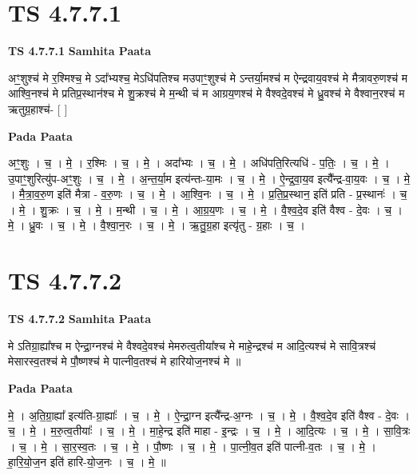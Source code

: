 \documentclass[17pt]{extarticle}
\begin{document}

\section{ TS 4.7.7.1 }

\textbf{TS 4.7.7.1 } \newline
\textbf{Samhita Paata} \newline

अꣳ॒॒शुश्च॑ मे र॒श्मिश्च॒ मे ऽदा᳚भ्यश्च॒ मेऽधि॑पतिश्च मउपाꣳ॒॒शुश्च॑ मे ऽन्तर्या॒मश्च॑ म ऐन्द्रवाय॒वश्च॑ मे मैत्रावरु॒णश्च॑ म आश्वि॒नश्च॑ मे प्रतिप्र॒स्थान॑श्च मे शु॒क्रश्च॑ मे म॒न्थी च॑ म आग्रय॒णश्च॑ मे वैश्वदे॒वश्च॑ मे ध्रु॒वश्च॑ मे वैश्वान॒रश्च॑ म ऋतुग्र॒हाश्च॑- [  ] \newline

\textbf{Pada Paata} \newline

अꣳ॒॒शुः । च॒ । मे॒ । र॒श्मिः । च॒ । मे॒ । अदा᳚भ्यः । च॒ । मे॒ । अधि॑पति॒रित्यधि॑ - प॒तिः॒ । च॒ । मे॒ । उ॒पाꣳ॒॒शुरित्यु॑प-अꣳ॒॒शुः । च॒ । मे॒ । अ॒न्त॒र्या॒म इत्य॑न्तः-या॒मः । च॒ । मे॒ । ऐ॒न्द्र॒वा॒य॒व इत्यै᳚न्द्र-वा॒य॒वः । च॒ । मे॒ । मै॒त्रा॒व॒रु॒ण इति॑ मैत्रा - व॒रु॒णः । च॒ । मे॒ । आ॒श्वि॒नः । च॒ । मे॒ । प्र॒ति॒प्र॒स्थान॒ इति॑ प्रति - प्र॒स्थानः॑ । च॒ । मे॒ । शु॒क्रः । च॒ । मे॒ । म॒न्थी । च॒ । मे॒ । आ॒ग्र॒य॒णः । च॒ । मे॒ । वै॒श्व॒दे॒व इति॑ वैश्व - दे॒वः । च॒ । मे॒ । ध्रु॒वः । च॒ । मे॒ । वै॒श्वा॒न॒रः । च॒ । मे॒ । ऋ॒तु॒ग्र॒हा इत्यृ॑तु - ग्र॒हाः । च॒ ।  \newline





\section{ TS 4.7.7.2 }

\textbf{TS 4.7.7.2 } \newline
\textbf{Samhita Paata} \newline

मे ऽतिग्रा॒ह्या᳚श्च म ऐन्द्रा॒ग्नश्च॑ मे वैश्वदे॒वश्च॑ मेमरुत्व॒तीया᳚श्च मे माहे॒न्द्रश्च॑ म आदि॒त्यश्च॑ मे सावि॒त्रश्च॑ मेसारस्व॒तश्च॑ मे पौ॒ष्णश्च॑ मे पात्नीव॒तश्च॑ मे हारियोज॒नश्च॑ मे ॥ \newline

\textbf{Pada Paata} \newline

मे॒ । अ॒ति॒ग्रा॒ह्या᳚ इत्य॑ति-ग्रा॒ह्याः᳚ । च॒ । मे॒ । ऐ॒न्द्रा॒ग्न इत्यै᳚न्द्र-अ॒ग्नः । च॒ । मे॒ । वै॒श्व॒दे॒व इति॑ वैश्व - दे॒वः । च॒ । मे॒ । म॒रु॒त्व॒तीयाः᳚ । च॒ । मे॒ । मा॒हे॒न्द्र इति॑ माहा - इ॒न्द्रः । च॒ । मे॒ । आ॒दि॒त्यः । च॒ । मे॒ । सा॒वि॒त्रः । च॒ । मे॒ । सा॒र॒स्व॒तः । च॒ । मे॒ । पौ॒ष्णः । च॒ । मे॒ । पा॒त्नी॒व॒त इति॑ पात्नी-व॒तः । च॒ । मे॒ । हा॒रि॒यो॒ज॒न इति॑ हारि-यो॒ज॒नः । च॒ । मे॒ ॥  \newline
\end{document}
